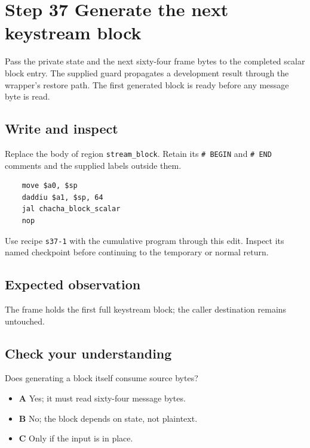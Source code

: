 \section{Step 37 Generate the next keystream block}\label{chacha-s37}

Pass the private state and the next sixty-four frame bytes to the completed scalar block entry. The supplied guard propagates a development result through the wrapper's restore path. The first generated block is ready before any message byte is read.

\subsection{Write and inspect}
Replace the body of region \texttt{stream\_block}. Retain its \texttt{\# BEGIN} and \texttt{\# END} comments and the supplied labels outside them.

\begin{verbatim}
    move $a0, $sp
    daddiu $a1, $sp, 64
    jal chacha_block_scalar
    nop
\end{verbatim}

Use recipe \texttt{s37-1} with the cumulative program through this edit. Inspect its named checkpoint before continuing to the temporary or normal return.

\subsection{Expected observation}
The frame holds the first full keystream block; the caller destination remains untouched.

\subsection{Check your understanding}
Does generating a block itself consume source bytes?

\begin{itemize}
\item \textbf{A} Yes; it must read sixty-four message bytes.
\item \textbf{B} No; the block depends on state, not plaintext.
\item \textbf{C} Only if the input is in place.
\end{itemize}
